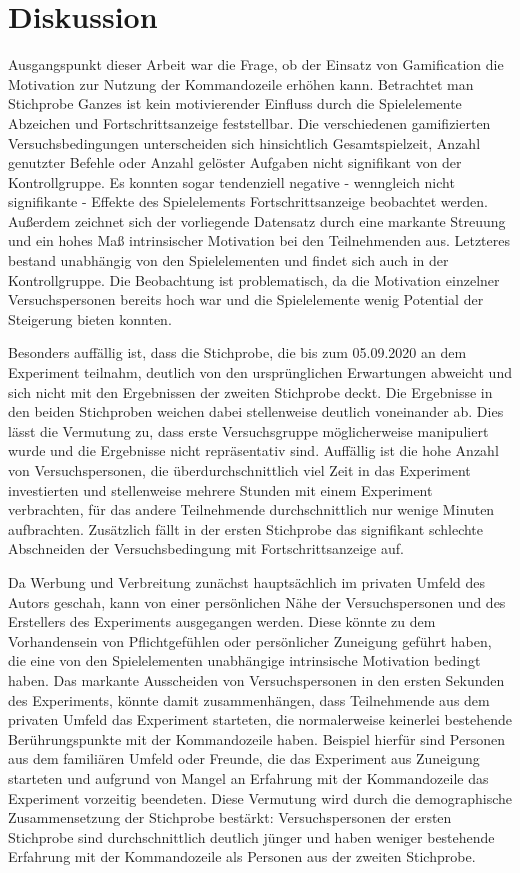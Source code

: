 \section{Diskussion}
Ausgangspunkt dieser Arbeit war die Frage, ob der Einsatz von Gamification die Motivation zur Nutzung der Kommandozeile erhöhen kann. Betrachtet man Stichprobe Ganzes ist kein motivierender Einfluss durch die Spielelemente Abzeichen und Fortschrittsanzeige feststellbar. Die verschiedenen gamifizierten Versuchsbedingungen unterscheiden sich hinsichtlich Gesamtspielzeit, Anzahl genutzter Befehle oder Anzahl gelöster Aufgaben nicht signifikant von der Kontrollgruppe. Es konnten sogar tendenziell negative - wenngleich nicht signifikante - Effekte des Spielelements Fortschrittsanzeige beobachtet werden. Außerdem zeichnet sich der vorliegende Datensatz durch eine markante Streuung und ein hohes Maß intrinsischer Motivation bei den Teilnehmenden aus. Letzteres bestand unabhängig von den Spielelementen und findet sich auch in der Kontrollgruppe. Die Beobachtung ist problematisch, da die Motivation einzelner Versuchspersonen bereits hoch war und die Spielelemente wenig Potential der Steigerung bieten konnten.

Besonders auffällig ist, dass die Stichprobe, die bis zum 05.09.2020 an dem Experiment teilnahm, deutlich von den ursprünglichen Erwartungen abweicht und sich nicht mit den Ergebnissen der zweiten Stichprobe deckt. Die Ergebnisse in den beiden Stichproben weichen dabei stellenweise deutlich voneinander ab. Dies lässt die Vermutung zu, dass erste Versuchsgruppe möglicherweise manipuliert wurde und die Ergebnisse nicht repräsentativ sind. Auffällig ist die hohe Anzahl von Versuchspersonen, die überdurchschnittlich viel Zeit in das Experiment investierten und stellenweise mehrere Stunden mit einem Experiment verbrachten, für das andere Teilnehmende durchschnittlich nur wenige Minuten aufbrachten. Zusätzlich fällt in der ersten Stichprobe das signifikant schlechte Abschneiden der Versuchsbedingung mit Fortschrittsanzeige auf.

Da Werbung und Verbreitung zunächst hauptsächlich im privaten Umfeld des Autors geschah, kann von einer persönlichen Nähe der Versuchspersonen und des Erstellers des Experiments ausgegangen werden. Diese könnte zu dem Vorhandensein von Pflichtgefühlen oder persönlicher Zuneigung geführt haben, die eine von den Spielelementen unabhängige intrinsische Motivation bedingt haben. Das markante Ausscheiden von Versuchspersonen in den ersten Sekunden des Experiments, könnte damit zusammenhängen, dass Teilnehmende aus dem privaten Umfeld das Experiment starteten, die normalerweise keinerlei bestehende Berührungspunkte mit der Kommandozeile haben. Beispiel hierfür sind Personen aus dem familiären Umfeld oder Freunde, die das Experiment aus Zuneigung starteten und aufgrund von Mangel an Erfahrung mit der Kommandozeile das Experiment vorzeitig beendeten. Diese Vermutung wird durch die demographische Zusammensetzung der Stichprobe bestärkt: Versuchspersonen der ersten Stichprobe sind durchschnittlich deutlich jünger und haben weniger bestehende Erfahrung mit der Kommandozeile als Personen aus der zweiten Stichprobe.


